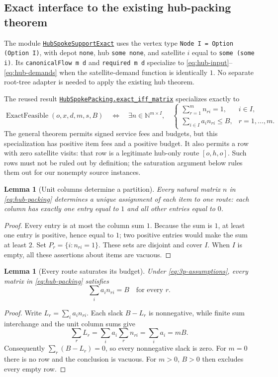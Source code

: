 \documentclass[11pt]{article}
\newtheorem{lemma}[theorem]{Lemma}
\theoremstyle{remark}
\newcommand{\N}{\mathbb N}
\newcommand{\EF}{\operatorname{ExactFeasible}}
\newcommand{\code}[1]{\nolinkurl{#1}}
\newcommand{\src}[2]{\href{https://github.com/huam54925-cpu/uav-routing-certification/blob/1bc992475a9bd515d77245e2bc0471e5ecab2fd5/LeanCompletion/UAV/#1.lean}{#2}}
\begin{document}
\subsection{Exact interface to the existing hub-packing theorem}

The module \src{HubSpokeSupportExact}{\code{HubSpokeSupportExact}} uses the vertex type
\code{Node I = Option (Option I)}, with depot \code{none}, hub \code{some none},
and satellite $i$ equal to \code{some (some i)}.
Its \code{canonicalFlow m d} and \code{required m d} specialize to
\eqref{eq:hub-input}--\eqref{eq:hub-demands} when the satellite-demand function is identically $1$.
No separate root-tree adapter is needed to apply the existing hub theorem.

The reused result
\src{HubSpokePacking}{\code{HubSpokePacking.exact_iff_matrix}}
specializes exactly to
\begin{equation}\label{eq:hub-packing}
 \EF(o,x,d,m,s,B)\quad\Longleftrightarrow\quad
 \exists n\in\N^{m\times I},\quad
 \begin{cases}
  \sum_{r=1}^m n_{ri}=1,& i\in I,\\
  \sum_{i\in I}a_i n_{ri}\leq B,&r=1,\ldots,m.
 \end{cases}
\end{equation}
The general theorem permits signed service fees and budgets, but this specialization has positive item fees and a positive budget.
It also permits a row with zero satellite visits: that row is a legitimate hub-only route $[o,h,o]$.
Such rows must not be ruled out by definition; the saturation argument below rules them out for our nonempty source instances.

\begin{lemma}[Unit columns determine a partition]\label{lem:partition}
Every natural matrix $n$ in \eqref{eq:hub-packing} determines a unique assignment of each item to one route: each column has exactly one entry equal to $1$ and all other entries equal to $0$.
\end{lemma}
\begin{proof}
Every entry is at most the column sum $1$. Because the sum is $1$, at least one entry is positive, hence equal to $1$; two positive entries would make the sum at least $2$.
Set $P_r=\{i:n_{ri}=1\}$. These sets are disjoint and cover $I$.
When $I$ is empty, all these assertions about items are vacuous.
\end{proof}

\begin{lemma}[Every route saturates its budget]\label{lem:saturation}
Under \eqref{eq:3p-assumptions}, every matrix in \eqref{eq:hub-packing} satisfies
\[
 \sum_i a_i n_{ri}=B\quad\text{for every }r.
\]
\end{lemma}
\begin{proof}
Write $L_r=\sum_i a_i n_{ri}$. Each slack $B-L_r$ is nonnegative, while finite sum interchange and the unit column sums give
\[
 \sum_r L_r=\sum_i a_i\sum_r n_{ri}=\sum_i a_i=mB.
\]
Consequently $\sum_r(B-L_r)=0$, so every nonnegative slack is zero.
For $m=0$ there is no row and the conclusion is vacuous.
For $m>0$, $B>0$ then excludes every empty row.
\end{proof}
\end{document}
